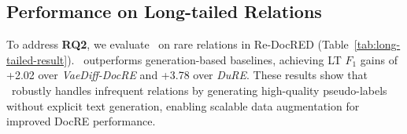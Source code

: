 \subsection{Performance on Long-tailed Relations}
To address \textbf{RQ2}, we evaluate \model\ on rare relations in Re-DocRED (Table~\ref{tab:long-tailed-result}). \model\ outperforms generation-based baselines, achieving LT $F_1$ gains of +2.02 over \textit{VaeDiff-DocRE} and +3.78 over \textit{DuRE}. These results show that \model\ robustly handles infrequent relations by generating high-quality pseudo-labels without explicit text generation, enabling scalable data augmentation for improved DocRE performance.

